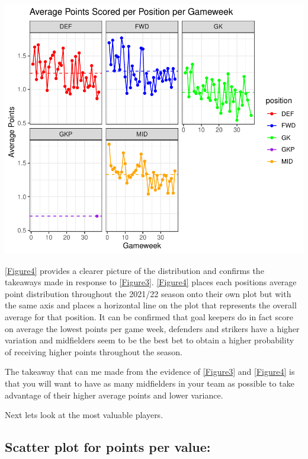 \documentclass[11pt,preprint, authoryear]{elsarticle}
\let\origfigure\figure
\let\endorigfigure\endfigure
\renewenvironment{figure}[1][2] {
    \expandafter\origfigure\expandafter[H]
} {
    \endorigfigure
}
\numberwithin{equation}{section}
\numberwithin{figure}{section}
\numberwithin{table}{section}
\begin{document}
\begin{figure}[H]

{\centering \includegraphics{Fantasy_premier_league_team_prediction_files/figure-latex/unnamed-chunk-5-1} 

}

\caption{Average points per postion individual plots\label{Figure4}}\label{fig:unnamed-chunk-5}
\end{figure}

\ref{Figure4} provides a clearer picture of the distribution and
confirms the takeaways made in response to \ref{Figure3}. \ref{Figure4}
places each positions average point distribution throughout the 2021/22
season onto their own plot but with the same axis and places a
horizontal line on the plot that represents the overall average for that
position. It can be confirmed that goal keepers do in fact score on
average the lowest points per game week, defenders and strikers have a
higher variation and midfielders seem to be the best bet to obtain a
higher probability of receiving higher points throughout the season.

The takeaway that can me made from the evidence of \ref{Figure3} and
\ref{Figure4} is that you will want to have as many midfielders in your
team as possible to take advantage of their higher average points and
lower variance.

Next lets look at the most valuable players.

\hypertarget{scatter-plot-for-points-per-value}{%
\subsection{Scatter plot for points per
value:}\label{scatter-plot-for-points-per-value}}
\end{document}
